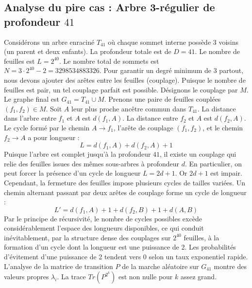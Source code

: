 \documentclass[11pt,a4paper]{article}
\begin{document}
\subsection{Analyse du pire cas : Arbre 3-régulier de profondeur $41$}
Considérons un arbre enraciné $T_{41}$ où chaque sommet interne possède 3 voisins (un parent et deux enfants).
La profondeur totale est de $D = 41$.
Le nombre de feuilles est $L = 2^{40}$.
Le nombre total de sommets est $N = 3 \cdot 2^{40} - 2 = 3298534883326$.
Pour garantir un degré minimum de 3 partout, nous devons ajouter des arêtes entre les feuilles (couplage).
Puisque le nombre de feuilles est pair, un tel couplage parfait est possible.
Désignons le couplage par $M$. Le graphe final est $G_{41} = T_{41} \cup M$.
Prenons une paire de feuilles couplées $(f_1, f_2) \in M$.
Soit $A$ leur plus proche ancêtre commun dans $T_{41}$.
La distance dans l'arbre entre $f_1$ et $A$ est $d(f_1, A)$.
La distance entre $f_2$ et $A$ est $d(f_2, A)$.
Le cycle formé par le chemin $A \to f_1$, l'arête de couplage $(f_1, f_2)$, et le chemin $f_2 \to A$ a pour longueur :
$$ L = d(f_1, A) + d(f_2, A) + 1 $$
Puisque l'arbre est complet jusqu'à la profondeur $41$, il existe un couplage qui relie des feuilles issues des mêmes sous-arbres à profondeur $d$.
En particulier, on peut forcer la présence d'un cycle de longueur $L = 2d + 1$. Or $2d+1$ est impair.
Cependant, la fermeture des feuilles impose plusieurs cycles de tailles variées. Un chemin alternant passant par deux arêtes de couplage forme un cycle de longueur :
$$ L' = d(f_1, A) + 1 + d(f_2, B) + 1 + d(A, B) $$
Par le principe de récursivité, le nombre de cycles possibles excède considérablement l'espace des longueurs disponibles, ce qui conduit inévitablement, par la structure dense des couplages sur $2^{40}$ feuilles, à la formation d'un cycle dont la longueur est une puissance de 2. Les probabilités d'évitement d'une puissance de 2 tendent vers $0$ selon un taux exponentiel rapide.
L'analyse de la matrice de transition $P$ de la marche aléatoire sur $G_{41}$ montre des valeurs propres $\lambda_i$. La trace $Tr(P^{2^k})$ est non nulle pour $k$ assez grand.
\end{document}
